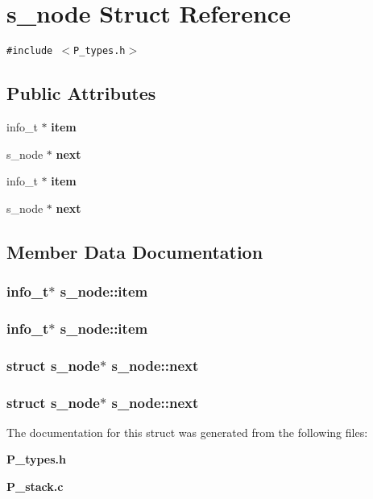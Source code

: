 \section{s\_\-node  Struct Reference}
\label{structs__node}
{\tt \#include $<$P\_\-types.h$>$}

\subsection*{Public Attributes}
\begin{CompactItemize}
\item 
info\_\-t $\ast$ {\bf item}
\item 
s\_\-node $\ast$ {\bf next}
\item 
info\_\-t $\ast$ {\bf item}
\item 
s\_\-node $\ast$ {\bf next}
\end{CompactItemize}


\subsection{Member Data Documentation}
\subsubsection{\setlength{\rightskip}{0pt plus 5cm}info\_\-t$\ast$ s\_\-node::item}\label{structs__node_m2}


\subsubsection{\setlength{\rightskip}{0pt plus 5cm}info\_\-t$\ast$ s\_\-node::item}\label{structs__node_m0}


\subsubsection{\setlength{\rightskip}{0pt plus 5cm}struct s\_\-node$\ast$ s\_\-node::next}\label{structs__node_m3}


\subsubsection{\setlength{\rightskip}{0pt plus 5cm}struct s\_\-node$\ast$ s\_\-node::next}\label{structs__node_m1}




The documentation for this struct was generated from the following files:\begin{CompactItemize}
\item 
{\bf P\_\-types.h}\item 
{\bf P\_\-stack.c}\end{CompactItemize}
